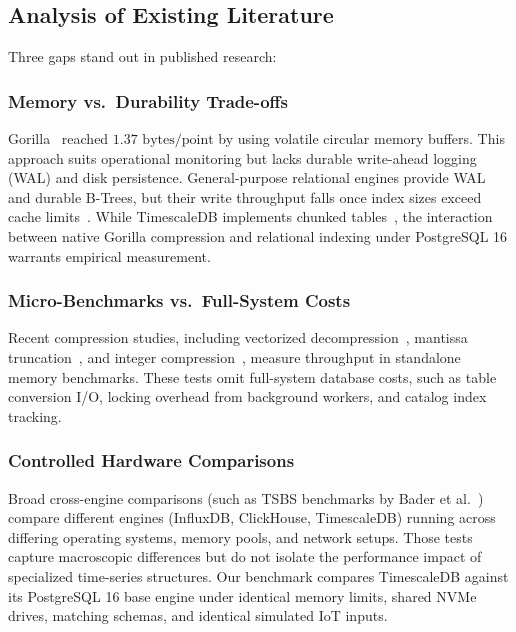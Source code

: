 \documentclass[conference,a4paper]{IEEEtran}
\begin{document}
\subsection{Analysis of Existing Literature}
Three gaps stand out in published research:

\subsubsection{Memory vs.\ Durability Trade-offs}
Gorilla~\cite{pelkonen2015gorilla} reached $1.37\text{ bytes/point}$ by using volatile circular memory buffers. This approach suits operational monitoring but lacks durable write-ahead logging (WAL) and disk persistence. General-purpose relational engines provide WAL and durable B-Trees, but their write throughput falls once index sizes exceed cache limits~\cite{patel2025empirical}. While TimescaleDB implements chunked tables~\cite{freedman2018timescaledb}, the interaction between native Gorilla compression and relational indexing under PostgreSQL 16 warrants empirical measurement.

\subsubsection{Micro-Benchmarks vs.\ Full-System Costs}
Recent compression studies, including vectorized decompression~\cite{durner2021exploiting}, mantissa truncation~\cite{zhang2023elf}, and integer compression~\cite{li2024sprint}, measure throughput in standalone memory benchmarks. These tests omit full-system database costs, such as table conversion I/O, locking overhead from background workers, and catalog index tracking.

\subsubsection{Controlled Hardware Comparisons}
Broad cross-engine comparisons (such as TSBS benchmarks by Bader et al.~\cite{bader2021benchmarking}) compare different engines (InfluxDB, ClickHouse, TimescaleDB) running across differing operating systems, memory pools, and network setups. Those tests capture macroscopic differences but do not isolate the performance impact of specialized time-series structures. Our benchmark compares TimescaleDB against its PostgreSQL 16 base engine under identical memory limits, shared NVMe drives, matching schemas, and identical simulated IoT inputs.

\end{document}
